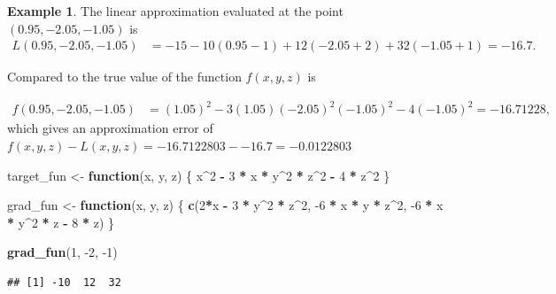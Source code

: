\documentclass[
]{book}
\newenvironment{Shaded}{\begin{snugshade}}{\end{snugshade}}
\newcommand{\ControlFlowTok}[1]{\textcolor[rgb]{0.13,0.29,0.53}{\textbf{#1}}}
\newcommand{\DecValTok}[1]{\textcolor[rgb]{0.00,0.00,0.81}{#1}}
\newcommand{\KeywordTok}[1]{\textcolor[rgb]{0.13,0.29,0.53}{\textbf{#1}}}
\newcommand{\NormalTok}[1]{#1}
\newcommand{\OperatorTok}[1]{\textcolor[rgb]{0.81,0.36,0.00}{\textbf{#1}}}
\newcommand{\StringTok}[1]{\textcolor[rgb]{0.31,0.60,0.02}{#1}}
\theoremstyle{definition}
\theoremstyle{definition}
\newtheorem{example}{Example}[chapter]
\theoremstyle{definition}
\theoremstyle{remark}
\begin{document}
\begin{example}
The linear approximation evaluated at the point \((0.95, -2.05, -1.05)\) is
\[
\begin{aligned}
L(0.95, -2.05, -1.05) & = -15 - 10(0.95 - 1) + 12 (-2.05 + 2) + 32 (-1.05 + 1) = -16.7.
\end{aligned}
\]

Compared to the true value of the function \(f(x, y, z)\) is

\[
\begin{aligned}
f(0.95, -2.05, -1.05) & = (1.05)^2 - 3(1.05)(-2.05)^2(-1.05)^2 - 4(-1.05)^2 = -16.71228,
\end{aligned}
\]
which gives an approximation error of \(f(x, y, z) - L(x, y, z) = -16.7122803 - -16.7 = -0.0122803\)

\begin{Shaded}
\begin{Highlighting}[]
\NormalTok{target_fun <-}\StringTok{ }\ControlFlowTok{function}\NormalTok{(x, y, z) \{}
\NormalTok{        x}\OperatorTok{^}\DecValTok{2} \OperatorTok{-}\StringTok{ }\DecValTok{3} \OperatorTok{*}\StringTok{ }\NormalTok{x }\OperatorTok{*}\StringTok{ }\NormalTok{y}\OperatorTok{^}\DecValTok{2} \OperatorTok{*}\StringTok{ }\NormalTok{z}\OperatorTok{^}\DecValTok{2} \OperatorTok{-}\StringTok{ }\DecValTok{4} \OperatorTok{*}\StringTok{ }\NormalTok{z}\OperatorTok{^}\DecValTok{2}
\NormalTok{\} }
        
\NormalTok{grad_fun <-}\StringTok{ }\ControlFlowTok{function}\NormalTok{(x, y, z) \{}
        \KeywordTok{c}\NormalTok{(}\DecValTok{2}\OperatorTok{*}\NormalTok{x }\OperatorTok{-}\StringTok{ }\DecValTok{3} \OperatorTok{*}\StringTok{ }\NormalTok{y}\OperatorTok{^}\DecValTok{2} \OperatorTok{*}\StringTok{ }\NormalTok{z}\OperatorTok{^}\DecValTok{2}\NormalTok{,}
          \DecValTok{-6} \OperatorTok{*}\StringTok{ }\NormalTok{x }\OperatorTok{*}\StringTok{ }\NormalTok{y }\OperatorTok{*}\StringTok{ }\NormalTok{z}\OperatorTok{^}\DecValTok{2}\NormalTok{,}
          \DecValTok{-6} \OperatorTok{*}\StringTok{ }\NormalTok{x }\OperatorTok{*}\StringTok{ }\NormalTok{y}\OperatorTok{^}\DecValTok{2} \OperatorTok{*}\StringTok{ }\NormalTok{z }\OperatorTok{-}\StringTok{ }\DecValTok{8} \OperatorTok{*}\StringTok{ }\NormalTok{z)}
\NormalTok{\}}

\KeywordTok{grad_fun}\NormalTok{(}\DecValTok{1}\NormalTok{, }\DecValTok{-2}\NormalTok{, }\DecValTok{-1}\NormalTok{)}
\end{Highlighting}
\end{Shaded}

\begin{verbatim}
## [1] -10  12  32
\end{verbatim}


\end{example}
\end{document}
